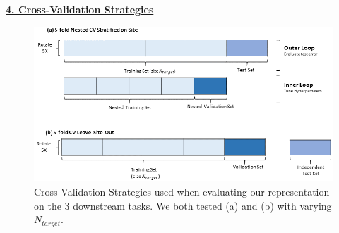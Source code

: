 \documentclass[runningheads]{llncs}
\begin{document}
\justify
\underline{\textbf{4. Cross-Validation Strategies}}
\label{supp_CV}
\begin{figure}[h!]
    \centering
    \includegraphics[width=\linewidth]{cv-schema-miccai21.png}
    \caption{Cross-Validation Strategies used when evaluating our representation on the 3 downstream tasks. We both tested (a) and (b) with varying $N_{target}$.}
\end{figure}
\end{document}
